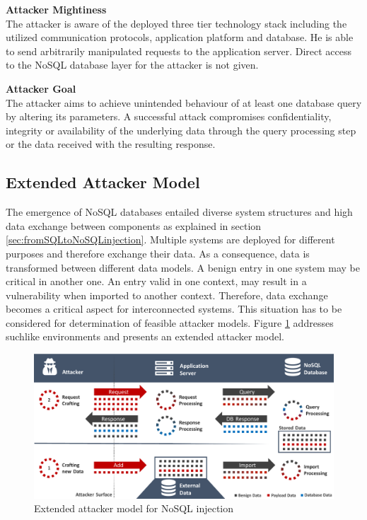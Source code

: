 \begin{minipage}[t]{0.48\textwidth}
  \textbf{Attacker Mightiness} \\ 
  The attacker is aware of the deployed three tier technology stack including the utilized communication protocols, application platform and database. He is able to send arbitrarily manipulated requests to the application server. Direct access to the NoSQL database layer for the attacker is not given.
\end{minipage}
\hfill
\begin{minipage}[t]{0.48\textwidth}
  \textbf{Attacker Goal} \\ 
  The attacker aims to achieve unintended behaviour of at least one database query by altering its parameters. A successful attack compromises confidentiality, integrity or availability of the underlying data through the query processing step or the data received with the resulting response.
\end{minipage}

\subsection{Extended Attacker Model}

The emergence of NoSQL databases entailed diverse system structures and high data exchange between components as explained in section \ref{sec:fromSQLtoNoSQLinjection}. Multiple systems are deployed for different purposes and therefore exchange their data. As a consequence, data is transformed between different data models. A benign entry in one system may be critical in another one. An entry valid in one context, may result in a vulnerability when imported to another context. Therefore, data exchange becomes a critical aspect for interconnected systems. This situation has to be considered for determination of feasible attacker models. Figure \ref{fig:extendedAttackerModel} addresses suchlike environments and presents an extended attacker model. \\

\begin{figure}[h]
\centering
  \includegraphics[width=1\linewidth]{Images/attacker_model_extended}
  \caption{Extended attacker model for NoSQL injection}
  \label{fig:extendedAttackerModel}
\end{figure}

